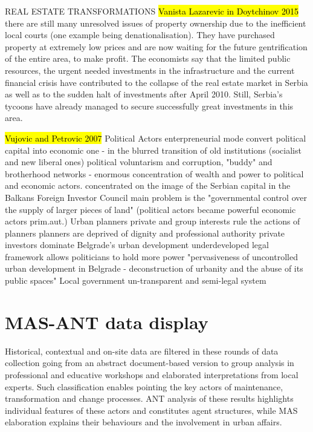 \documentclass[11pt]{report}
\begin{document}
REAL ESTATE TRANSFORMATIONS
\hl{Vanista Lazarevic in Doytchinov 2015}
there are still many unresolved issues of property ownership due to  the  inefficient  local  courts  (one  example  being denationalisation).  They  have purchased property at extremely low prices and are now waiting for the future gentrification of the entire area, to make profit. The economists say that the limited public resources, the urgent needed investments in the infrastructure and  the  current  financial  crisis  have  contributed  to  the  collapse  of  the  real estate market in Serbia as well as to the sudden halt of investments after April 2010. Still, Serbia’s tycoons have already managed to secure successfully great investments in this area.

\hl{Vujovic and Petrovic 2007}
	Political Actors
enterpreneurial mode
convert political capital into economic one - in the blurred transition of old institutions (socialist and  new liberal ones)
political voluntarism and corruption, "buddy" and brotherhood networks - enormous concentration of wealth and power to political and economic actors.
concentrated on the image of the Serbian capital in the Balkans
	Foreign Investor Council
main problem is the "governmental control over the supply of larger pieces of land" (political actors became powerful economic actors prim.aut.)
	Urban planners
private and group interests rule the actions of planners
planners are deprived of dignity and professional authority
private investors dominate Belgrade's urban development
underdeveloped legal framework allows politicians to hold more power
"pervasiveness of uncontrolled urban development in Belgrade - deconstruction of urbanity and the abuse of its public spaces"
	Local government un-transparent and semi-legal system
    
\chapter{MAS-ANT data display}

Historical, contextual and on-site data are filtered in these rounds of data collection going from an abstract document-based version to group analysis in professional and educative workshops and elaborated interpretations from local experts. Such classification enables pointing the key actors of maintenance, transformation and change processes. ANT analysis of these results highlights individual features of these actors and constitutes agent structures, while MAS elaboration explains their behaviours and the involvement in urban affairs.
\end{document}
